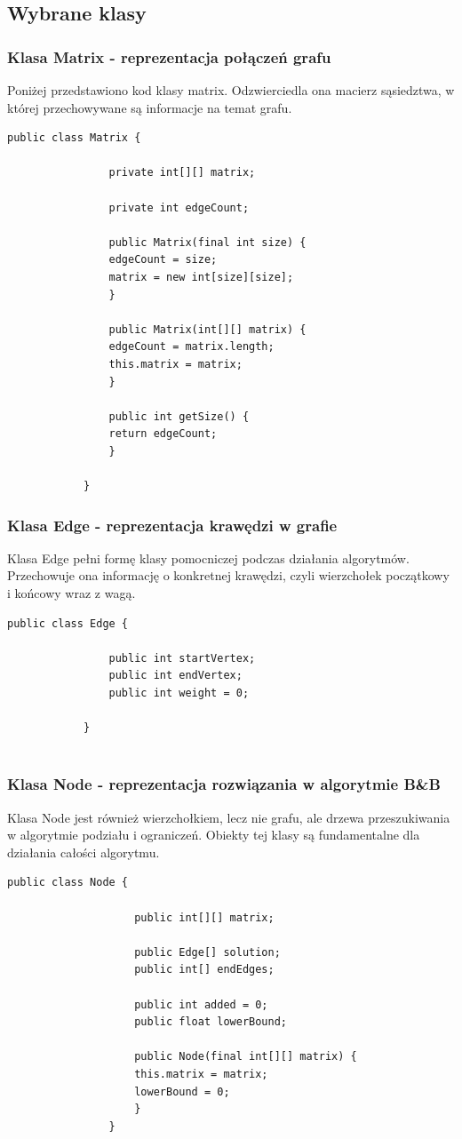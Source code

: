 \documentclass{article}
\begin{document}
	\subsection{Wybrane klasy}
	
		\subsubsection{Klasa Matrix - reprezentacja połączeń grafu}
			Poniżej przedstawiono kod klasy matrix. Odzwierciedla ona macierz sąsiedztwa, w której przechowywane są informacje na temat grafu.
			
			\begin{lstlisting}[xleftmargin=-100pt]
			public class Matrix {
			
				private int[][] matrix;
			
				private int edgeCount;
				
				public Matrix(final int size) {
				edgeCount = size;
				matrix = new int[size][size];
				}
				
				public Matrix(int[][] matrix) {
				edgeCount = matrix.length;
				this.matrix = matrix;
				}
										
				public int getSize() {
				return edgeCount;
				}
				
			}
			\end{lstlisting}
		\subsubsection{Klasa Edge - reprezentacja krawędzi w grafie}
		
		Klasa Edge pełni formę klasy pomocniczej podczas działania algorytmów. Przechowuje ona informację o konkretnej krawędzi, czyli wierzchołek początkowy i końcowy wraz z wagą.
			\begin{lstlisting}[xleftmargin=-100pt]
			public class Edge {
			
				public int startVertex;
				public int endVertex;
				public int weight = 0;
						
			}
			
			\end{lstlisting}
		\subsubsection{Klasa Node - reprezentacja rozwiązania w algorytmie B\&B}
			Klasa Node jest również wierzchołkiem, lecz nie grafu, ale drzewa przeszukiwania w algorytmie podziału i ograniczeń. Obiekty tej klasy są fundamentalne dla działania całości algorytmu. 
				\begin{lstlisting}[xleftmargin=-150pt]
				public class Node {
					
					public int[][] matrix;
					
					public Edge[] solution;
					public int[] endEdges;
					
					public int added = 0;
					public float lowerBound;
					
					public Node(final int[][] matrix) {
					this.matrix = matrix;
					lowerBound = 0;
					}
				}
				\end{lstlisting}
\end{document}
